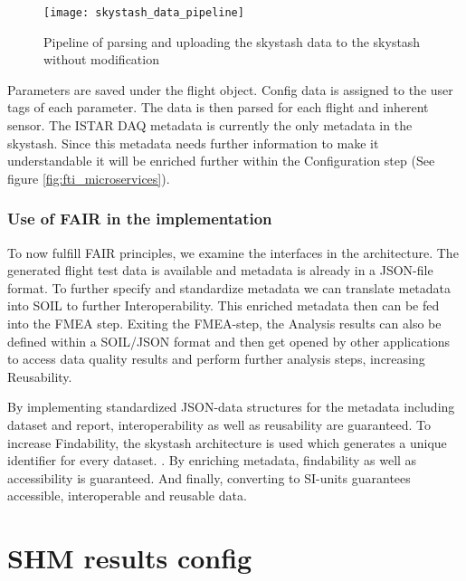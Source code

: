 \begin{figure}
    \centering
    \texttt{[image: skystash\_data\_pipeline]}
    \caption{Pipeline of parsing and uploading the skystash data to the skystash without modification}
    \label{fig:skystash_data_pipeline}
\end{figure}

Parameters are saved under the flight object. Config data is assigned to the user tags of each parameter. The data is then parsed for each flight and inherent sensor.
The ISTAR DAQ metadata is currently the only metadata in the skystash. Since this metadata needs further information to make it understandable it will be enriched further within the Configuration step (See figure \ref{fig:fti_microservices}).

\newpage

\subsubsection{Use of FAIR in the implementation}
To now fulfill FAIR principles, we examine the interfaces in the architecture. The generated flight test data is available and metadata is already in a JSON-file format. To further specify and standardize metadata we can translate metadata into SOIL to further Interoperability. This enriched metadata then can be fed into the FMEA step. Exiting the FMEA-step, the Analysis results can also be defined within a SOIL/JSON format and then get opened by other applications to access data quality results and perform further analysis steps, increasing Reusability.


By implementing standardized JSON-data structures for the metadata including dataset and report, interoperability as well as reusability are guaranteed. To increase Findability, the skystash architecture is used which generates a unique identifier for every dataset. \cite{meyer_development_2020}. By enriching metadata, findability as well as accessibility is guaranteed. And finally, converting to SI-units guarantees accessible, interoperable and reusable data.

\newpage


\section{SHM results config}

